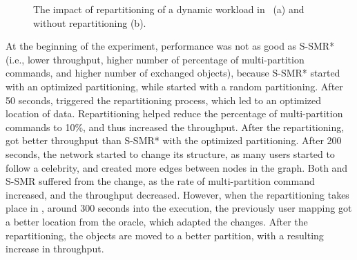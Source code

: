\begin{figure}[h!]
\begin{subfigure}{.49\textwidth}
    \caption{}
  \end{subfigure}
  \caption{The impact of repartitioning of a dynamic workload in \dynastar~(a) and \ssmr without repartitioning (b).}%
  \label{fig:socialcelebrity}
\end{figure}

At the beginning of the experiment, \dynastar performance was not as good as S-SMR* (i.e., lower throughput, higher number of
percentage of multi-partition commands, and higher number of exchanged objects), because S-SMR* started with an optimized
partitioning, while \dynastar started with a random partitioning. 
After 50 seconds, \dynastar triggered the repartitioning process, which led to an optimized location of data. Repartitioning helped
reduce the percentage of multi-partition commands to 10\%, and thus increased the throughput. After the repartitioning, \dynastar got better
throughput than S-SMR* with the optimized partitioning.
After 200 seconds, the network started to change its structure, as many users started to follow a celebrity, and created more edges
between nodes in the graph. Both \dynastar and S-SMR suffered from the change, as the rate of multi-partition command increased, and the throughput
decreased. However, when the repartitioning takes place in \dynastar, around 300 seconds into the execution, the previously user mapping
got a better location from the oracle, which adapted the changes. After the repartitioning, the objects are moved to a better partition, with a resulting increase in throughput.


